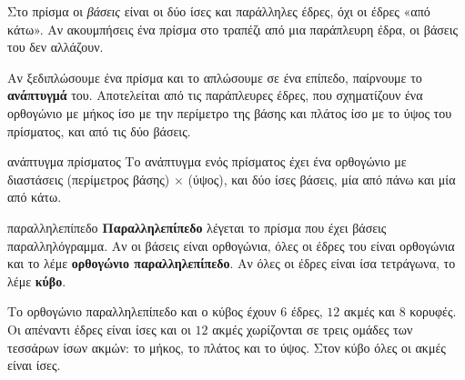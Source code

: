 \begin{prosoxi}
Στο πρίσμα οι \emph{βάσεις} είναι οι δύο ίσες και παράλληλες έδρες, όχι οι έδρες «από κάτω». Αν ακουμπήσεις ένα πρίσμα στο τραπέζι από μια παράπλευρη έδρα, οι βάσεις του δεν αλλάζουν.
\end{prosoxi}


Αν ξεδιπλώσουμε ένα πρίσμα και το απλώσουμε σε ένα επίπεδο, παίρνουμε το \textbf{ανάπτυγμά} του. Αποτελείται από τις παράπλευρες έδρες, που σχηματίζουν ένα ορθογώνιο με μήκος ίσο με την περίμετρο της βάσης και πλάτος ίσο με το ύψος του πρίσματος, και από τις δύο βάσεις.

\begin{center}
\end{center}

\begin{kanonas}{ανάπτυγμα πρίσματος}
Το ανάπτυγμα ενός πρίσματος έχει ένα ορθογώνιο με διαστάσεις (περίμετρος βάσης) $\times$ (ύψος), και δύο ίσες βάσεις, μία από πάνω και μία από κάτω.
\end{kanonas}


\begin{orismos}{παραλληλεπίπεδο}
\textbf{Παραλληλεπίπεδο} λέγεται το πρίσμα που έχει βάσεις παραλληλόγραμμα. Αν οι βάσεις είναι ορθογώνια, όλες οι έδρες του είναι ορθογώνια και το λέμε \textbf{ορθογώνιο παραλληλεπίπεδο}. Αν όλες οι έδρες είναι ίσα τετράγωνα, το λέμε \textbf{κύβο}.
\end{orismos}

Το ορθογώνιο παραλληλεπίπεδο και ο κύβος έχουν $6$ έδρες, $12$ ακμές και $8$ κορυφές. Οι απέναντι έδρες είναι ίσες και οι $12$ ακμές χωρίζονται σε τρεις ομάδες των τεσσάρων ίσων ακμών: το μήκος, το πλάτος και το ύψος. Στον κύβο όλες οι ακμές είναι ίσες.

